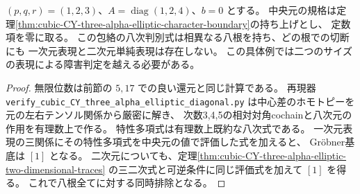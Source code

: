 \begin{example}\label{ex:cubic-CY-three-alpha-elliptic-eight-diagonal-roots}
$(p,q,r)=(1,2,3)$、$A=\operatorname{diag}(1,2,4)$、$b=0$ とする。
中央元の規格は定理\ref{thm:cubic-CY-three-alpha-elliptic-character-boundary}の持ち上げとし、
定数項を零に取る。
この包絡の八次判別式は相異なる八根を持ち、どの根での切断にも
一次元表現と二次元単純表現は存在しない。
この具体例では二つのサイズの表現による障害判定を越える必要がある。
\end{example}
\begin{proof}
無限位数は前節の $5,17$ での良い還元と同じ計算である。
再現器
\texttt{verify\_cubic\_CY\_\allowbreak{}three\_alpha\_elliptic\_\allowbreak{}diagonal.py}
は中心差のホモトピーを元の左右テンソル関係から厳密に解き、
次数3,4,5の相対対角cochainと八次元の作用を有理数上で作る。
特性多項式は有理数上既約な八次式である。
一次元表現の三関係にその特性多項式を中央元の値で評価した式を加えると、
Gröbner基底は $[1]$ となる。
二次元についても、定理\ref{thm:cubic-CY-three-alpha-elliptic-two-dimensional-traces}
の三二次式と可逆条件に同じ評価式を加えて $[1]$ を得る。
これで八根全てに対する同時排除となる。
\end{proof}
